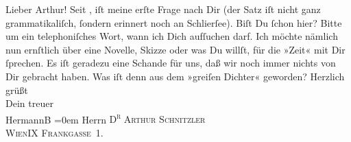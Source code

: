 \begin{ledgroupsized}[t]{13cm}
           \pstart\center{}Lieber Arthur! \pend\pstart
           Seit \label{K_L00583_1v}\label{K_L00583_1h}, iſt meine erſte Frage nach Dir (der Satz iſt nicht ganz
               grammatikaliſch, ſondern erinnert noch an Schlierſee). Biſt Du ſchon hier? Bitte um ein telephoniſches Wort, wann ich
               Dich aufſuchen darf. Ich möchte nämlich nun ernſtlich über eine Novelle, Skizze oder
               was Du {\pb}willſt, für die »Zeit« mit Dir ſprechen. Es iſt geradezu eine Schande für
               uns, daß wir noch immer nichts von Dir gebracht haben. Was iſt denn aus dem »greiſen Dichter« geworden?\pend
           \pstart
           Herzlich grüßt{\\[\baselineskip]}Dein treuer{\\[\baselineskip]}\spacefill\mbox{HermannB}\pend
           \leftskip=0em{}\pstart
           \noindent{}Herrn \textsc{D\textsuperscript{r} Arthur Schnitzler}{\\}\textsc{WienIX Frankgasse 1}.\pend
           \pstart
           \textcolor{gray}{\textbf{\label{T_L00583_1v}\label{T_L00583_1h}}}\pend
           
         
         \endnumbering{}\end{ledgroupsized}  \newcommand{\dateiname}{L00583}\newcommand{\titel}{Hermann Bahr an Arthur Schnitzler, 2. 9. 1896}\newcommand{\editorInnen}{ Kurt Ifkovits,  Martin Anton Müller}
      